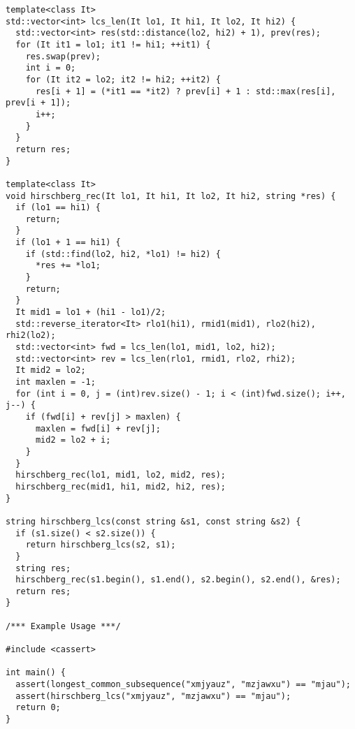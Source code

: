 \begin{lstlisting}
template<class It>
std::vector<int> lcs_len(It lo1, It hi1, It lo2, It hi2) {
  std::vector<int> res(std::distance(lo2, hi2) + 1), prev(res);
  for (It it1 = lo1; it1 != hi1; ++it1) {
    res.swap(prev);
    int i = 0;
    for (It it2 = lo2; it2 != hi2; ++it2) {
      res[i + 1] = (*it1 == *it2) ? prev[i] + 1 : std::max(res[i], prev[i + 1]);
      i++;
    }
  }
  return res;
}

template<class It>
void hirschberg_rec(It lo1, It hi1, It lo2, It hi2, string *res) {
  if (lo1 == hi1) {
    return;
  }
  if (lo1 + 1 == hi1) {
    if (std::find(lo2, hi2, *lo1) != hi2) {
      *res += *lo1;
    }
    return;
  }
  It mid1 = lo1 + (hi1 - lo1)/2;
  std::reverse_iterator<It> rlo1(hi1), rmid1(mid1), rlo2(hi2), rhi2(lo2);
  std::vector<int> fwd = lcs_len(lo1, mid1, lo2, hi2);
  std::vector<int> rev = lcs_len(rlo1, rmid1, rlo2, rhi2);
  It mid2 = lo2;
  int maxlen = -1;
  for (int i = 0, j = (int)rev.size() - 1; i < (int)fwd.size(); i++, j--) {
    if (fwd[i] + rev[j] > maxlen) {
      maxlen = fwd[i] + rev[j];
      mid2 = lo2 + i;
    }
  }
  hirschberg_rec(lo1, mid1, lo2, mid2, res);
  hirschberg_rec(mid1, hi1, mid2, hi2, res);
}

string hirschberg_lcs(const string &s1, const string &s2) {
  if (s1.size() < s2.size()) {
    return hirschberg_lcs(s2, s1);
  }
  string res;
  hirschberg_rec(s1.begin(), s1.end(), s2.begin(), s2.end(), &res);
  return res;
}

/*** Example Usage ***/

#include <cassert>

int main() {
  assert(longest_common_subsequence("xmjyauz", "mzjawxu") == "mjau");
  assert(hirschberg_lcs("xmjyauz", "mzjawxu") == "mjau");
  return 0;
}
\end{lstlisting}
